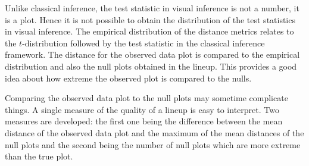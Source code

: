 \documentclass[12]{article}
\newcommand{\red}[1]{{\color{red} #1}}
\newcommand{\green}[1]{{\color{cyan} #1}}
\begin{document}
Unlike classical inference, the test statistic in visual inference is not a number, it is a plot. Hence it is not possible to obtain the distribution of the test statistics in visual inference. The empirical distribution of the distance metrics relates to the $t$-distribution followed by the test statistic in the classical inference framework. The distance for the observed data plot is compared to the empirical distribution and also the null plots obtained in the lineup. This provides a good idea about how extreme the observed plot is compared to the nulls.

Comparing the observed data plot to the null plots may sometime complicate things. A single measure of the quality of a lineup is easy to interpret. Two measures are developed: the first one being the difference between the mean distance of the observed data plot and the maximum of the mean distances of the null plots and the second being the number of null plots which are more extreme than the true plot.


 
%


\end{document}
